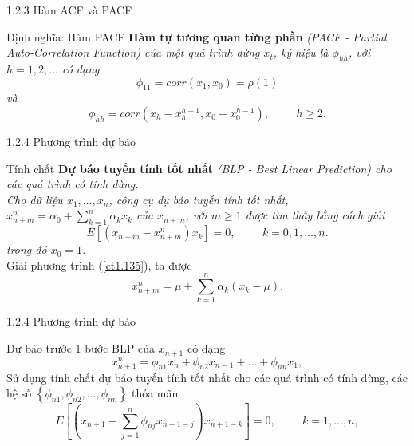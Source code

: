 \documentclass[notheorems,envcountsect,hyperref=unicode]{beamer}
\begin{document}
\begin{frame}{1.2.3 Hàm ACF và PACF}
	\begin{block}{Định nghĩa: Hàm PACF \cite{1}}
\textbf{Hàm tự tương quan từng phần} \textit{(PACF - Partial Auto-Correlation Function) của một quá trình dừng $x_{t}$, ký hiệu là $\phi_{hh}$, với $h=1, 2, \dots$ có dạng
	\begin{equation}
	\phi_{11}=corr(x_{1}, x_{0})=\rho(1) \label{ct1.130}
	\end{equation}	
	và 
	\begin{equation}
	\phi_{hh} = corr(x_{h}-x_h^{h-1}, x_{0}-x_0^{h-1}), \hspace{1cm} h \geq 2. \label{ct1.131}	
	\end{equation}}
	\end{block}
\end{frame}

\begin{frame}{1.2.4 Phương trình dự báo}
	\begin{block}{Tính chất \cite{1}}
\textbf{\label{BLP}Dự báo tuyến tính tốt nhất} \textit{(BLP - Best Linear Prediction) cho các quá trình có tính dừng.\\
Cho dữ liệu $x_{1}, \dots, x_{n}$, công cụ dự báo tuyến tính tốt nhất, $x_{n+m}^n= \alpha_{0} + \sum_{k=1}^{n}\alpha_{k} x_{k}$ của $x_{n+m}$, với $m\geq1$ được tìm thấy bằng cách giải
	\begin{equation}
	E[(x_{n+m} - x_{n+m}^n)x_{k}] = 0, \hspace{1cm} k=0, 1, \dots, n. \label{ct1.135}
	\end{equation}
	trong đó $x_{0}=1$.}\\
\pause
Giải phương trình (\ref{ct1.135}), ta được
\begin{equation}
x_{n+m}^{n}=\mu+\sum_{k=1}^{n}\alpha_k(x_k-\mu).
\end{equation}
	\end{block}
\end{frame}

\begin{frame}{1.2.4 Phương trình dự báo}
	\begin{block}{Dự báo trước 1 bước \cite{1}}
BLP của $x_{n+1}$ có dạng
\begin{equation}
x_{n+1}^n = \phi_{n1}x_{n}+ \phi_{n2}x_{n-1}+ \dots+ \phi_{nn}x_{1}, \label{ct1.138}
\end{equation}
Sử dụng tính chất dự báo tuyến tính tốt nhất cho các quá trình có tính dừng, các hệ số $\left\lbrace \phi_{n1}, \phi_{n2}, \dots, \phi_{nn}\right\rbrace$ thỏa mãn
$$E[(x_{n+1} - \sum_{j=1}^{n} \phi_{nj}x_{n+1-j})x_{n+1-k}] =0, \hspace{1cm} k=1, \dots, n,$$
	\end{block}
\end{frame}
\end{document}
